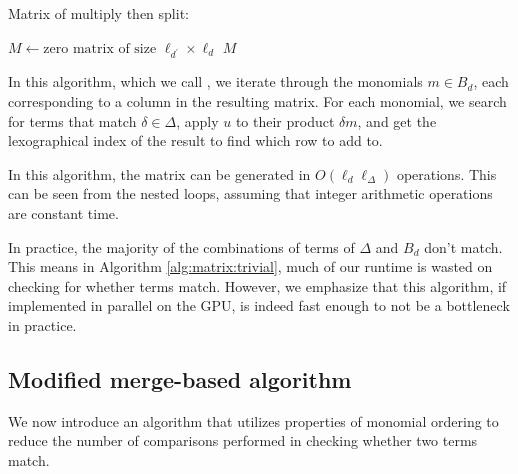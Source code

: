 \begin{algorithm}[H]
    \caption{Matrix of multiply then split: \triv}
    \label{alg:matrix:trivial}
    $M \gets \text{zero matrix of size } \ell_{d^\prime} \times \ell_d $\;
    \Return $M$
\end{algorithm}

In this algorithm, which we call \triv, we iterate through 
the monomials $m \in B_{d}$, each corresponding to a column in the
resulting matrix. For each monomial, we search for terms 
that match $\delta \in \Delta$, apply $u$ to their product $\delta m$, and 
get the lexographical index of the result to find which 
row to add to.

In this algorithm, the matrix can be generated in 
$O(\ell_{d}\ell_{\Delta})$ operations. 
This can be
seen from the nested loops, assuming that integer 
arithmetic operations are constant time.

In practice, the majority of the combinations of 
terms of $\Delta$ and $B_{d}$ don't match. This means in
Algorithm \ref{alg:matrix:trivial}, much of our 
runtime is wasted on checking for whether terms match.
However, we emphasize that this algorithm, if 
implemented in parallel on the GPU, is indeed
fast enough to not be a bottleneck in practice.

\subsection{Modified merge-based algorithm}

We now introduce an algorithm that utilizes 
properties of monomial ordering to reduce the 
number of comparisons 
performed in checking whether two terms match.

